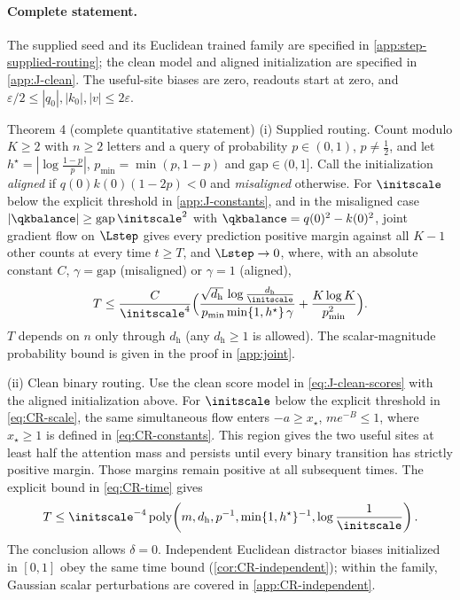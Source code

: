 \paragraph{Complete statement.}\label{app:J-full-statement}
The supplied seed and its Euclidean trained family are specified in
\cref{app:step-supplied-routing}; the clean model and aligned initialization
are specified in \cref{app:J-clean}. The useful-site biases are zero,
readouts start at zero, and $\varepsilon/2\le|q_0|,|k_0|,|v|\le2\varepsilon$.
\begin{restated}{Theorem 4 (complete quantitative statement)}
\textnormal{(i) Supplied routing.} Count modulo $K\ge2$ with $n\ge2$ letters and a query of probability $p\in(0,1)$, $p\neq\tfrac{1}{2}$, and let $h^\star=|\log\tfrac{1-p}{p}|$,
$p_{\min}=\min(p,1-p)$ and $\mathrm{gap}\in(0,1]$. Call the initialization \emph{aligned} if $q(0)k(0)(1-2p)<0$ and \emph{misaligned} otherwise.
For $\initscale$ below the explicit threshold in \cref{app:J-constants}, and in the misaligned case
$|\qkbalance|\ge\mathrm{gap}\,\initscale^2$ with $\qkbalance=q(0)^2-k(0)^2$, joint gradient flow on $\Lstep$ gives
every prediction positive margin against all $K-1$ other counts at every time $t\ge T$, and $\Lstep\to0$, where, with an absolute constant $C$,
$\gamma=\mathrm{gap}$ (misaligned) or $\gamma=1$ (aligned),
\[
 T\le\frac{C}{\initscale^4}\Bigl(\frac{\sqrt{d_{\mathrm h}}\,\log\frac{d_{\mathrm h}}{\initscale}}{p_{\min}\min\{1,h^\star\}\,\gamma}+\frac{K\log K}{p_{\min}^2}\Bigr).
\]
$T$ depends on $n$ only through $d_{\mathrm h}$ (any $d_{\mathrm h}\ge1$ is allowed).
The scalar-magnitude probability bound is given in the proof in \cref{app:joint}.

\textnormal{(ii) Clean binary routing.} Use the clean score model in \cref{eq:J-clean-scores} with the aligned initialization above.
For $\initscale$ below the explicit threshold in \cref{eq:CR-scale}, the same simultaneous flow
enters $-a\ge x_\star$, $me^{-B}\le1$, where $x_\star\ge1$ is defined in \cref{eq:CR-constants}.
This region gives the two useful sites at least half the attention mass and persists until every binary transition has
strictly positive margin. Those margins remain positive at all subsequent times. The explicit bound in \cref{eq:CR-time} gives
\[
 T\le\initscale^{-4}\operatorname{poly}\!\left(m,d_{\mathrm h},p^{-1},
 \min\{1,h^\star\}^{-1},\log\frac1{\initscale}\right).
\]
The conclusion allows $\delta=0$. Independent Euclidean distractor biases initialized in $[0,1]$ obey the same time bound
(\cref{cor:CR-independent}); within the family, Gaussian scalar perturbations are covered in \cref{app:CR-independent}.


\end{restated}
